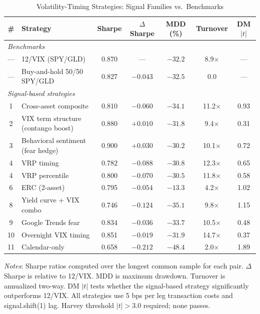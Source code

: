 \documentclass[12pt,a4paper]{article}
\begin{document}
\begin{table}[H]
\centering
\small
\begin{threeparttable}
\caption{Volatility-Timing Strategies: Signal Families vs.\ Benchmarks}
\label{tab:strategy_results}
\begin{tabular}{@{}clccccc@{}}
\toprule
\# & Strategy & Sharpe & $\Delta$Sharpe & MDD (\%) & Turnover & DM $|t|$ \\
\midrule
\multicolumn{7}{l}{\textit{Benchmarks}} \\
--- & 12/VIX (SPY/GLD) & 0.870 & --- & $-32.2$ & 8.9$\times$ & --- \\
--- & Buy-and-hold 50/50 SPY/GLD & 0.827 & $-0.043$ & $-32.5$ & 0.0 & --- \\
\midrule
\multicolumn{7}{l}{\textit{Signal-based strategies}} \\
1 & Cross-asset composite & 0.810 & $-0.060$ & $-34.1$ & 11.2$\times$ & 0.93 \\
2 & VIX term structure (contango boost) & 0.880 & $+0.010$ & $-31.8$ & 9.4$\times$ & 0.31 \\
3 & Behavioral sentiment (fear hedge) & 0.900 & $+0.030$ & $-30.2$ & 10.1$\times$ & 0.72 \\
4 & VRP timing & 0.782 & $-0.088$ & $-30.8$ & 12.3$\times$ & 0.65 \\
4 & VRP percentile & 0.800 & $-0.070$ & $-30.5$ & 11.8$\times$ & 0.58 \\
6 & ERC (2-asset) & 0.795 & $-0.054$ & $-13.3$ & 4.2$\times$ & 1.02 \\
8 & Yield curve + VIX combo & 0.746 & $-0.124$ & $-35.1$ & 9.8$\times$ & 1.15 \\
9 & Google Trends fear & 0.834 & $-0.036$ & $-33.7$ & 10.5$\times$ & 0.48 \\
10 & Overnight VIX timing & 0.851 & $-0.019$ & $-31.9$ & 14.7$\times$ & 0.37 \\
11 & Calendar-only & 0.658 & $-0.212$ & $-48.4$ & 2.0$\times$ & 1.89 \\
\bottomrule
\end{tabular}
\begin{tablenotes}
\small
\item \textit{Notes}: Sharpe ratios computed over the longest common sample for each pair. $\Delta$Sharpe is relative to 12/VIX. MDD is maximum drawdown. Turnover is annualized two-way. DM $|t|$ tests whether the signal-based strategy significantly outperforms 12/VIX. All strategies use 5 bps per leg transaction costs and signal.shift(1) lag. Harvey threshold $|t|>3.0$ required; none passes.
\end{tablenotes}
\end{threeparttable}
\end{table}
\end{document}
